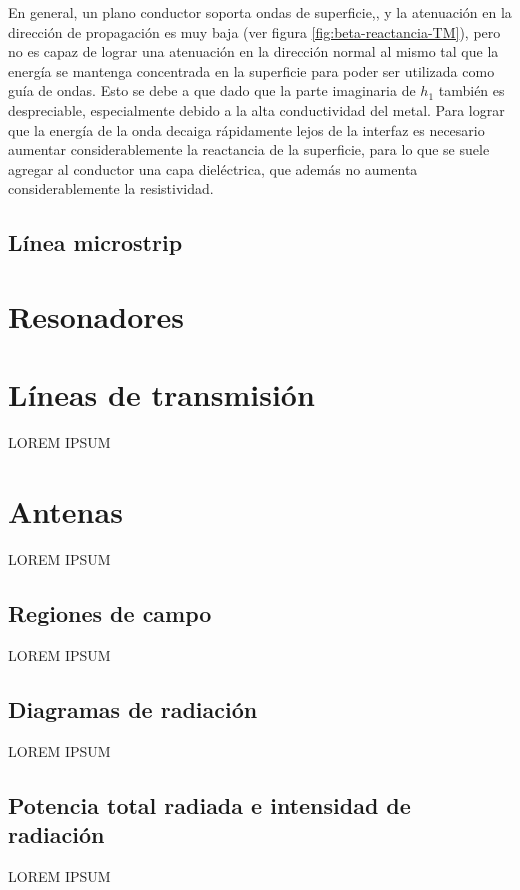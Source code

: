 En general, un plano conductor soporta ondas de superficie,, y la atenuación en la dirección de propagación es muy baja (ver figura \ref{fig:beta-reactancia-TM}), pero no es capaz de lograr una atenuación en la dirección normal al mismo tal que la energía se mantenga concentrada en la superficie para poder ser utilizada como guía de ondas. Esto se debe a que dado que la parte imaginaria de $h_1$ también es despreciable, especialmente debido a la alta conductividad del metal. Para lograr que la energía de la onda decaiga rápidamente lejos de la interfaz es necesario aumentar considerablemente la reactancia de la superficie, para lo que se suele agregar al conductor una capa dieléctrica, que además no aumenta considerablemente la resistividad.





\subsection{Línea microstrip}

\section{Resonadores}

\section{Líneas de transmisión}
\label{subsec_lineas_de_transmision}
LOREM IPSUM
\section{Antenas}
\label{subsec_antenas}
LOREM IPSUM
\subsection{Regiones de campo}
\label{subsubsec_regiones_de_campo}
LOREM IPSUM
\subsection{Diagramas de radiación}
\label{subsubsec_diag_de_rad}
LOREM IPSUM
\subsection{Potencia total radiada e intensidad de radiación}
\label{subsubsec_pot_total_radiada}
LOREM IPSUM
